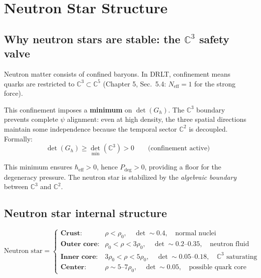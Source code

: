 \documentclass[12pt]{article}
\theoremstyle{definition}
\theoremstyle{remark}
\begin{document}
\section{Neutron Star Structure}

\subsection{Why neutron stars are stable: the $\mathbb{C}^3$ safety valve}

Neutron matter consists of confined baryons. In DRLT, confinement means quarks are restricted to $\mathbb{C}^3 \subset \mathbb{C}^5$ (Chapter 5, Sec.~5.4: $N_\text{eff} = 1$ for the strong force).

This confinement imposes a \textbf{minimum} on $\det(G_h)$. The $\mathbb{C}^3$ boundary prevents complete $\psi$ alignment: even at high density, the three spatial directions maintain some independence because the temporal sector $\mathbb{C}^2$ is decoupled. Formally:
\begin{equation}
\det(G_h) \geq \det_\text{min}(\mathbb{C}^3) > 0 \qquad \text{(confinement active)}
\end{equation}

This minimum ensures $\hbar_\text{eff} > 0$, hence $P_\text{deg} > 0$, providing a floor for the degeneracy pressure. The neutron star is stabilized by the \emph{algebraic boundary} between $\mathbb{C}^3$ and $\mathbb{C}^2$.

\subsection{Neutron star internal structure}

\begin{equation}
\text{Neutron star} = \begin{cases}
\textbf{Crust:} & \rho < \rho_0, \quad \det \sim 0.4, \quad \text{normal nuclei} \\
\textbf{Outer core:} & \rho_0 < \rho < 3\rho_0, \quad \det \sim 0.2\text{--}0.35, \quad \text{neutron fluid} \\
\textbf{Inner core:} & 3\rho_0 < \rho < 5\rho_0, \quad \det \sim 0.05\text{--}0.18, \quad \text{$\mathbb{C}^3$ saturating} \\
\textbf{Center:} & \rho \sim 5\text{--}7\rho_0, \quad \det \sim 0.05, \quad \text{possible quark core}
\end{cases}
\end{equation}
\end{document}

